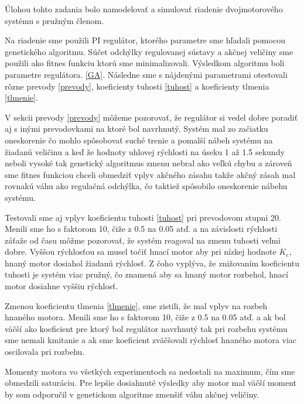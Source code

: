 Úlohou tohto zadania bolo namodelovať a simulovať riadenie dvojmotorového systému s pružným členom.

Na riadenie sme použili PI regulátor, ktorého parametre sme hľadali pomocou genetického algoritmu. Súčet odchýlky regulovanej sústavy a akčnej veličiny sme použili ako fitnes funkciu ktorú sme minimalizovali. Výsledkom algoritmu boli parametre regulátora. \ref{GA}. Následne sme s nájdenými parametrami otestovali rôzne prevody \ref{prevody}, koeficienty tuhosti \ref{tuhost} a koeficienty tlmenia \ref{tlmenie}.

V sekcii prevody \ref{prevody} môžeme pozorovať, že regulátor si vedel dobre poradiť aj s inými prevodovkami na ktoré bol navrhnutý. Systém mal zo začiatku oneskorenie čo mohlo spôsobovať suché trenie a pomalší nábeh systému na žiadanú veličinu a keď že hodnoty uhlovej rýchlosti na úseku 1 až 1.5 sekundy neboli vysoké tak genetický algoritmus zmenu nebral ako veľkú chybu a zároveň sme fitnes funkciou chceli obmedziť vplyv akčného zásahu takže akčný zásah mal rovnakú váhu ako regulačná odchýlka, čo taktiež spôsobilo oneskorenie nábehu systému.

Testovali sme aj vplyv koeficientu tuhosti \ref{tuhost} pri prevodovom stupni 20. Menili sme ho s faktorom 10, čiže z 0.5 na 0.05 atď. a na závislosti rýchlosti záťaže od času môžme pozorovať, že systém reagoval na zmenu tuhosti veľmi dobre. Vyššou rýchlosťou sa musel točiť hnací motor aby pri nízkej hodnote $K_e$, hnaný motor dosiahol žiadanú rýchlosť. Z čoho vyplýva, že znižovaním koeficientu tuhosti je systém viac pružný, čo znamená aby sa hnaný motor rozbehol, hnací motor dosiahne vyššiu rýchlosť.

Zmenou koeficientu tlmenia \ref{tlmenie}, sme zistili, že mal vplyv na rozbeh hnaného motora. Menili sme ho s faktorom 10, čiže z 0.5 na 0.05 atď. a ak bol väčší ako koeficient pre ktorý bol regulátor navrhnutý tak pri rozbehu systému sme nemali kmitanie a ak sme koeficient zväčšovali rýchlosť hnaného motora viac oscilovala pri rozbehu.

Momenty motora vo všetkých experimentoch sa nedostali na maximum, čím sme obmedzili saturáciu. Pre lepšie dosiahnuté výsledky aby motor mal väčší moment by som odporučil v genetickom algoritme zmenšiť váhu akčnej veličiny.